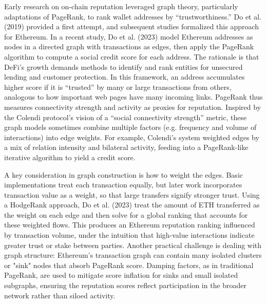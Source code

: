 \documentclass[12pt]{article}
\begin{document}
Early research on on-chain reputation leveraged graph theory, particularly adaptations of PageRank, to rank wallet addresses by ``trustworthiness.'' Do et al. (2019) provided a first attempt, and subsequent studies formalized this approach for Ethereum. In a recent study, Do et al. (2023) model Ethereum addresses as nodes in a directed graph with transactions as edges, then apply the PageRank algorithm to compute a social credit score for each address. The rationale is that DeFi's growth demands methods to identify and rank entities for unsecured lending and customer protection. In this framework, an address accumulates higher score if it is ``trusted'' by many or large transactions from others, analogous to how important web pages have many incoming links. PageRank thus measures connectivity strength and activity as proxies for reputation. Inspired by the Colendi protocol's vision of a ``social connectivity strength'' metric, these graph models sometimes combine multiple factors (e.g. frequency and volume of interactions) into edge weights. For example, Colendi's system weighted edges by a mix of relation intensity and bilateral activity, feeding into a PageRank-like iterative algorithm to yield a credit score.


A key consideration in graph construction is how to weight the edges. Basic implementations treat each transaction equally, but later work incorporates transaction value as a weight, so that large transfers signify stronger trust. Using a HodgeRank approach, Do et al. (2023) treat the amount of ETH transferred as the weight on each edge and then solve for a global ranking that accounts for these weighted flows. This produces an Ethereum reputation ranking influenced by transaction volume, under the intuition that high-value interactions indicate greater trust or stake between parties. Another practical challenge is dealing with graph structure: Ethereum's transaction graph can contain many isolated clusters or "sink" nodes that absorb PageRank score. Damping factors, as in traditional PageRank, are used to mitigate score inflation for sinks and small isolated subgraphs, ensuring the reputation scores reflect participation in the broader network rather than siloed activity.
\end{document}
